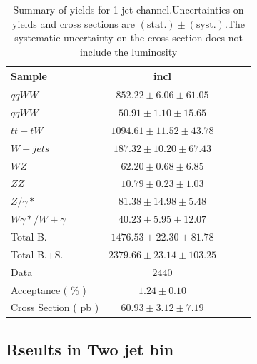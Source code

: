 \begin{table}[!ht]
{\small
\begin{center}
\begin{tabular}{|l|c|c|c|c|}
\hline
Sample	& incl	\\ \hline
$qqWW$	& $852.22 \pm 6.06 \pm 61.05 $	\\ 
$qqWW$	& $50.91 \pm 1.10 \pm 15.65 $	\\ 
$t\bar{t} + tW$	& $1094.61 \pm 11.52 \pm 43.78 $	\\ 
$W+jets$	& $187.32 \pm 10.20 \pm 67.43 $	\\ 
$WZ$	& $62.20 \pm 0.68 \pm 6.85 $	\\ 
$ZZ$	& $10.79 \pm 0.23 \pm 1.03 $	\\ 
$Z/\gamma*$	& $81.38 \pm 14.98 \pm 5.48 $	\\ 
$W\gamma*/W+\gamma$	& $40.23 \pm 5.95 \pm 12.07 $	\\ 
\hline \hline 
Total B.	& $1476.53 \pm 22.30 \pm 81.78 $	\\ \hline \hline 
Total B.+S.	& $2379.66 \pm 23.14 \pm 103.25 $	\\ \hline \hline
Data	& $2440$ 	\\ \hline \hline
Acceptance ( \% )	& $1.24 \pm 0.10 	$\\ 
Cross Section ( pb )	& $60.93 \pm 3.12 \pm 7.19$ 	\\ \hline
\end{tabular}
\caption{Summary of yields for 1-jet channel.Uncertainties on yields and cross sections are $\mathrm{(stat.)} \pm \mathrm{(syst.)}$.The systematic uncertainty on the cross section does not include the luminosity}
\label{tab:datayields_wwxsec_1j}
\end{center}}
\end{table}
\clearpage
\subsection{Rseults in Two jet bin}

